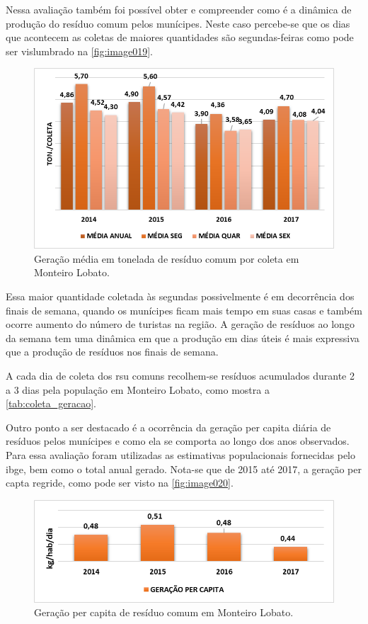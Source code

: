 	Nessa avaliação também foi possível obter e compreender como é a dinâmica de produção do resíduo comum pelos munícipes. Neste caso percebe-se que os dias que acontecem as coletas de maiores quantidades são segundas-feiras como pode ser vislumbrado na \autoref{fig:image019}.
	
	\begin{figure}
		\centering
		\includegraphics[width=0.7\linewidth]{produtos/prodtres/image019}
		\caption{Geração média em tonelada de resíduo comum por coleta em Monteiro Lobato.}
		\label{fig:image019}
	\end{figure}
	
	Essa maior quantidade coletada às segundas possivelmente é em decorrência dos finais de semana, quando os munícipes ficam mais tempo em suas casas e também ocorre aumento do número de turistas na região. A geração de resíduos ao longo da semana tem uma dinâmica em que a produção em dias úteis é mais expressiva que a produção de resíduos nos finais de semana.
	
	A cada dia de coleta dos \gls{rsu} comuns recolhem-se resíduos acumulados durante 2 a 3 dias pela população em Monteiro Lobato, como mostra a \autoref{tab:coleta_geracao}.
	
	

	Outro ponto a ser destacado é a ocorrência da geração per capita diária de resíduos pelos munícipes e como ela se comporta ao longo dos anos observados. Para essa avaliação foram utilizadas as estimativas populacionais fornecidas pelo \gls{ibge}, bem como o total anual gerado. Nota-se que de 2015 até 2017, a geração per capta regride, como pode ser visto na \autoref{fig:image020}.
	
\begin{figure}
	\centering
	\includegraphics[width=0.7\linewidth]{produtos/prodtres/image020}
	\caption{Geração per capita de resíduo comum em Monteiro Lobato.}
	\label{fig:image020}
\end{figure}

